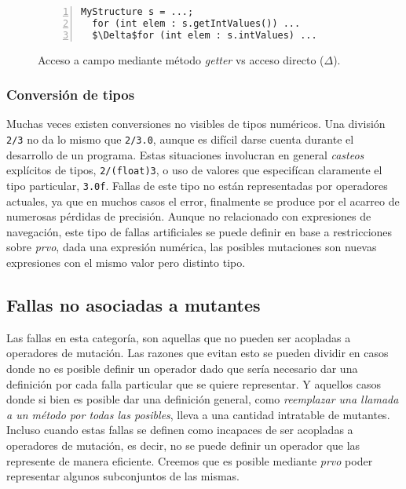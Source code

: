 \begin{figure}
	\begin{lstlisting}[frame=single, numbers=left, mathescape=true,framexleftmargin=1.5em]
  MyStructure s = ...;
  for (int elem : s.getIntValues()) ...
  $\Delta$for (int elem : s.intValues) ...
	\end{lstlisting}
	\caption{Acceso a campo mediante m\'etodo \emph{getter} vs acceso directo ($\Delta$).}
	\label{figures.examples.getterVsDirectAccess}
\end{figure}

\subsubsection{Conversi\'on de tipos}

Muchas veces existen conversiones no visibles de tipos num\'ericos. Una divisi\'on \texttt{2/3} no da lo mismo que \texttt{2/3.0}, aunque es dif\'icil darse cuenta durante el desarrollo de un programa. Estas situaciones involucran en general \emph{casteos} expl\'icitos de tipos, \texttt{2/(float)3}, o uso de valores que especif\'ican claramente el tipo particular, \texttt{3.0f}. Fallas de este tipo no est\'an representadas por operadores actuales, ya que en muchos casos el error, finalmente se produce por el acarreo de numerosas p\'erdidas de precisi\'on. Aunque no relacionado con expresiones de navegaci\'on, este tipo de fallas artificiales se puede definir en base a restricciones sobre \emph{prvo}, dada una expresi\'on num\'erica, las posibles mutaciones son nuevas expresiones con el mismo valor pero distinto tipo.

\subsection{Fallas no asociadas a mutantes}

Las fallas en esta categor\'ia, son aquellas que no pueden ser acopladas a operadores de mutaci\'on. Las razones que evitan esto se pueden dividir en casos donde no es posible definir un operador dado que ser\'ia necesario dar una definici\'on por cada falla particular que se quiere representar. Y aquellos casos donde si bien es posible dar una definici\'on general, como \emph{reemplazar una llamada a un m\'etodo por todas las posibles}, lleva a una cantidad intratable de mutantes. Incluso cuando estas fallas se definen como incapaces de ser acopladas a operadores de mutaci\'on, es decir, no se puede definir un operador que las represente de manera eficiente. Creemos que es posible mediante \emph{prvo} poder representar algunos subconjuntos de las mismas.

